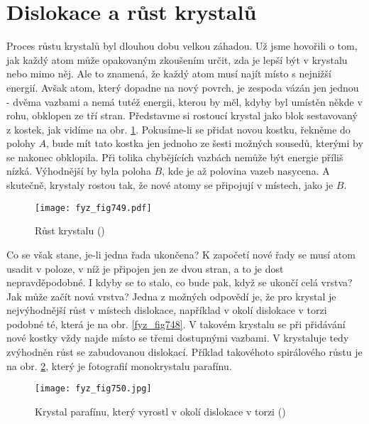 {  \section{Dislokace a růst krystalů}\label{fyz:IIchapXXXsecVIII}
    Proces růstu krystalů byl dlouhou dobu velkou záhadou. Už jsme hovořili o tom, jak každý atom 
    může opakovaným zkoušením určit, zda je lepší být v krystalu nebo mimo něj. Ale to znamená, že 
    každý atom musí najít místo s nejnižší energií. Avšak atom, který dopadne na nový povrch, je 
    zespoda vázán jen jednou - dvěma vazbami a nemá tutéž energii, kterou by měl, kdyby byl umístěn 
    někde v rohu, obklopen ze tří stran. Představme si rostoucí krystal jako blok sestavovaný z 
    kostek, jak vidíme na obr. \ref{fyz_fig749}. Pokusíme-li se přidat novou kostku, řekněme do 
    polohy \(A\), bude mít tato kostka jen jednoho ze šesti možných sousedů, kterými by se nakonec 
    obklopila. Při tolika chybějících vazbách nemůže být energie příliš nízká. Výhodnější by byla 
    poloha \(B\), kde je až polovina vazeb nasycena. A skutečně, krystaly rostou tak, že nové atomy 
    se připojují v místech, jako je \(B\).
    
    \begin{figure}[ht!] %
      \centering
      \texttt{[image: fyz\_fig749.pdf]}
      \caption{Růst krystalu
               (\cite[s.~555]{Feynman02})}
      \label{fyz_fig749}
    \end{figure}

    Co se však stane, je-li jedna řada ukončena? K započetí nové řady se musí atom usadit v poloze, 
    v níž je připojen jen ze dvou stran, a to je dost nepravděpodobné. I kdyby se to stalo, co bude 
    pak, když se ukončí celá vrstva? Jak může začít nová vrstva? Jedna z možných odpovědí je, že 
    pro krystal je nejvýhodnější růst v místech dislokace, například v okolí dislokace v torzi 
    podobné té, která je na obr. \ref{fyz_fig748}. V takovém krystalu se při přidávání nové kostky 
    vždy najde místo se třemi dostupnými vazbami. V krystaluje tedy zvýhodněn růst se zabudovanou 
    dislokací. Příklad takovéhoto spirálového růstu je na obr. \ref{fyz_fig750}, který je 
    fotografií monokrystalu parafínu.
    
    \begin{figure}[ht!] %
      \centering
      \texttt{[image: fyz\_fig750.jpg]}
      \caption{Krystal parafínu, který vyrostl v okolí dislokace v torzi
               (\cite[s.~555]{Feynman02})}
      \label{fyz_fig750}
    \end{figure}

}
